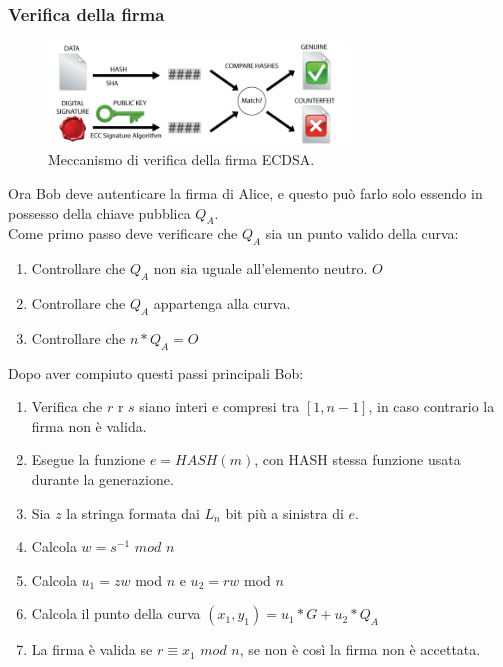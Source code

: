 \documentclass[a4paper,11pt]{report}
\begin{document}
\subsubsection{Verifica della firma}
\begin{figure}[htbp] 
\begin{center}
\includegraphics[width=8cm]{img/E.png} 
\end{center}
\caption{Meccanismo di verifica della firma ECDSA. \cite{SHA}}
\end{figure}
Ora Bob deve autenticare la firma di Alice, e questo può farlo solo essendo in possesso della chiave pubblica $Q_{A}$.\\
Come primo passo deve verificare che $Q_{A}$ sia un punto valido della curva:
\begin{enumerate}
\item Controllare che $Q_{A}$ non sia uguale all'elemento neutro. $O$
\item Controllare che $Q_{A}$ appartenga alla curva.
\item Controllare che $n*Q_{A}=O$ 
\end{enumerate}
Dopo aver compiuto questi passi principali Bob:
\begin{enumerate}
\item Verifica che $r$ r $s$ siano interi e compresi tra $[1,n-1]$, in caso contrario la firma non è valida.
\item Esegue la funzione $e=HASH(m)$, con HASH stessa funzione usata durante la generazione.
\item Sia $z$ la stringa formata dai $L_{n}$ bit più a sinistra di $e$.
\item Calcola $w=s^{-1}$ $mod$ $n$
\item Calcola $u_{1} = zw$ mod $n$ e $u_{2} = rw$ mod $n$
\item Calcola il punto della curva $(x_{1},y_{1}) = u_{1}*G+u_{2}*Q_{A}$
\item La firma è valida se $r\equiv x_{1}$ $mod$ $n$, se non è così la firma non è accettata.
\end{enumerate}
\end{document}
